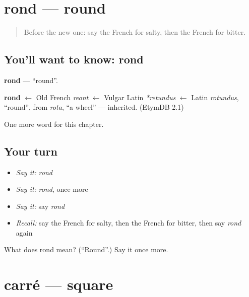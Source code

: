 \section[rond]{rond — round}

\label{lesson:FR-C94-rond}



\begin{quote}
Before the new one: say the French for salty, then the French for bitter.
\end{quote}

\subsection*{You'll want to know: rond}
\textbf{rond} — \textquotedblleft{}round\textquotedblright{}.

\begin{cousinweb}
\textbf{rond} $\leftarrow$ Old French \emph{reont} $\leftarrow$ Vulgar Latin \emph{*retundus} $\leftarrow$ Latin \emph{rotundus}, \textquotedblleft{}round\textquotedblright{}, from \emph{rota}, \textquotedblleft{}a wheel\textquotedblright{} — inherited. (EtymDB 2.1)
\end{cousinweb}

\begin{grammarlens}[title={What you've built}]
One more word for this chapter.
\end{grammarlens}

\subsection*{Your turn}
\begin{itemize}
\raggedright
  \item \emph{Say it:} \emph{rond}
  \item \emph{Say it:} \emph{rond}, once more
  \item \emph{Say it:} say \emph{rond}
  \item \emph{Recall:} say the French for salty, then the French for bitter, then say \emph{rond} again
\end{itemize}

\begin{tcolorbox}[breakable,colback=teal!4,colframe=teal!35!black,title={Before you move on}]
What does rond mean? (\textquotedblleft{}Round\textquotedblright{}.) Say it once more.
\end{tcolorbox}
\section[carré]{carré — square}

